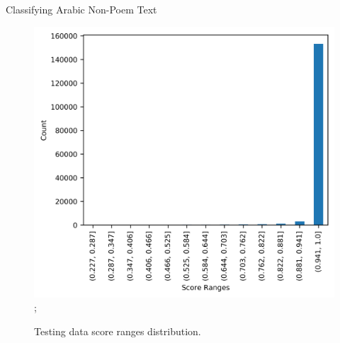 

\begin{frame}[fragile]{Classifying Arabic Non-Poem Text}
\begin{figure}[!t]
{\includegraphics[scale=.65]{./Figures/IMG_Result_Distribution.png}};
	\caption{Testing data score ranges distribution.}
\end{figure}

\end{frame}

